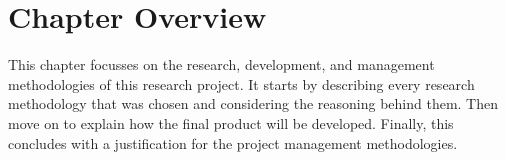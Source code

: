 \section{Chapter Overview}

This chapter focusses on the research, development, and management methodologies of this research project. It starts by describing every research methodology that was chosen and considering the reasoning behind them. Then move on to explain how the final product will be developed. Finally, this concludes with a justification for the project management methodologies.